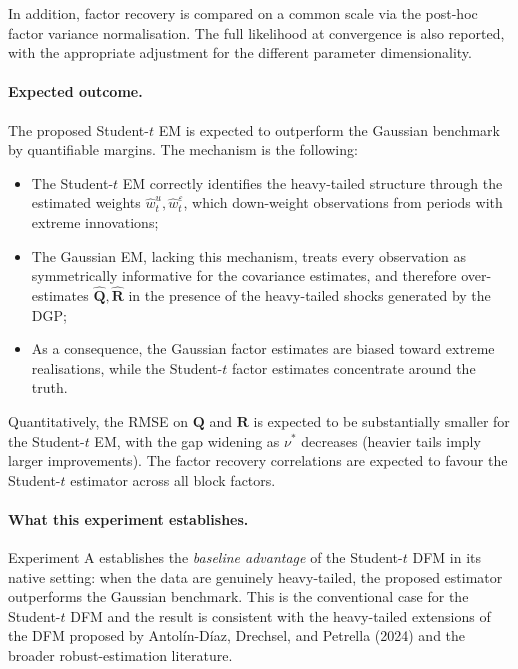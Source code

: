\documentclass[11pt, a4paper, oneside]{article}
\newcommand{\mR}{\mathbf{R}}
\begin{document}
In addition, factor recovery is compared on a common scale via the
post-hoc factor variance normalisation. The full likelihood at
convergence is also reported, with the appropriate adjustment for
the different parameter dimensionality.

\paragraph{Expected outcome.}
The proposed Student-$t$ EM is expected to outperform the Gaussian
benchmark by quantifiable margins. The mechanism is the following:
\begin{itemize}[leftmargin=1.5em, itemsep=3pt]
    \item The Student-$t$ EM correctly identifies the heavy-tailed
          structure through the estimated weights
          $\hat{w}^u_t, \hat{w}^\varepsilon_t$, which down-weight
          observations from periods with extreme innovations;
    \item The Gaussian EM, lacking this mechanism, treats every
          observation as symmetrically informative for the
          covariance estimates, and therefore over-estimates
          $\hat{\mathbf{Q}}, \hat{\mR}$ in the presence of the
          heavy-tailed shocks generated by the DGP;
    \item As a consequence, the Gaussian factor estimates are
          biased toward extreme realisations, while the Student-$t$
          factor estimates concentrate around the truth.
\end{itemize}
Quantitatively, the RMSE on $\mathbf{Q}$ and $\mR$ is expected to be
substantially smaller for the Student-$t$ EM, with the gap widening
as $\nu^*$ decreases (heavier tails imply larger improvements). The
factor recovery correlations are expected to favour the Student-$t$
estimator across all block factors.

\paragraph{What this experiment establishes.}
Experiment A establishes the \emph{baseline advantage} of the
Student-$t$ DFM in its native setting: when the data are genuinely
heavy-tailed, the proposed estimator outperforms the Gaussian
benchmark. This is the conventional case for the Student-$t$ DFM and
the result is consistent with the heavy-tailed extensions of the DFM
proposed by Antol\'in-D\'iaz, Drechsel, and Petrella (2024) and the
broader robust-estimation literature.
\end{document}
